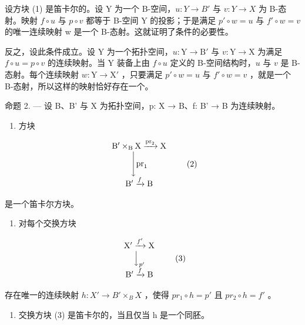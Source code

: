 设方块 (1) 是笛卡尔的。设 Y 为一个 B-空间，\(u: Y \to B'\) 与 \(v: Y \to X\) 为 B-态射。映射 \(f \circ u\) 与 \(p \circ v\) 都等于 B-空间 Y 的投影；于是满足 \(p' \circ w = u\) 与 \(f' \circ w = v\) 的唯一连续映射 w 是一个 B-态射。这就证明了条件的必要性。

反之，设此条件成立。设 Y 为一个拓扑空间，\(u \colon \mathrm{Y} \to \mathrm{B}'\) 与 \(v \colon \mathrm{Y} \to \mathrm{X}\) 为满足 \(f \circ u = p \circ v\) 的连续映射。当 Y 装备上由 \(f \circ u\) 定义的 B-空间结构时，\(u\) 与 \(v\) 是 B-态射。每个连续映射 \(w \colon \mathrm{Y} \to \mathrm{X}'\) ，只要满足 \(p' \circ w = u\) 与 \(f' \circ w = v\) ，就是一个 B-态射，所以这样的映射恰好存在一个。

命题 2. --- 设 B、B' 与 X 为拓扑空间，p: X → B、f: B' → B 为连续映射。

\begin{enumerate}
\def\labelenumi{\alph{enumi})}
\tightlist
\item
  方块
\end{enumerate}

\[
\begin{array}{c} \mathrm{B} ^ {\prime} \times_ {\mathrm{B}} \mathrm{X} \xrightarrow {\mathrm{pr} _ {2}} \mathrm{X} \\ \Biggl \downarrow \mathrm{pr} _ {1} \\ \mathrm{B} ^ {\prime} \xrightarrow {f} \mathrm{B} \end{array}\tag{2}
\]

是一个笛卡尔方块。

\begin{enumerate}
\def\labelenumi{\alph{enumi})}
\setcounter{enumi}{1}
\tightlist
\item
  对每个交换方块
\end{enumerate}

\[
\begin{array}{c} \mathrm {X^ {\prime}} \xrightarrow {f ^ {\prime}} \mathrm{X} \\ \Big \downarrow_ {p ^ {\prime}} \\ \mathrm {B^ {\prime}} \xrightarrow {f} \mathrm{B} \end{array}\tag{3}
\]

存在唯一的连续映射 \(h: X' \to B' \times_{B} X\) ，使得 \(pr_{1} \circ h = p'\) 且 \(pr_{2} \circ h = f'\) 。

\begin{enumerate}
\def\labelenumi{\alph{enumi})}
\setcounter{enumi}{2}
\tightlist
\item
  交换方块 (3) 是笛卡尔的，当且仅当 h 是一个同胚。
\end{enumerate}

